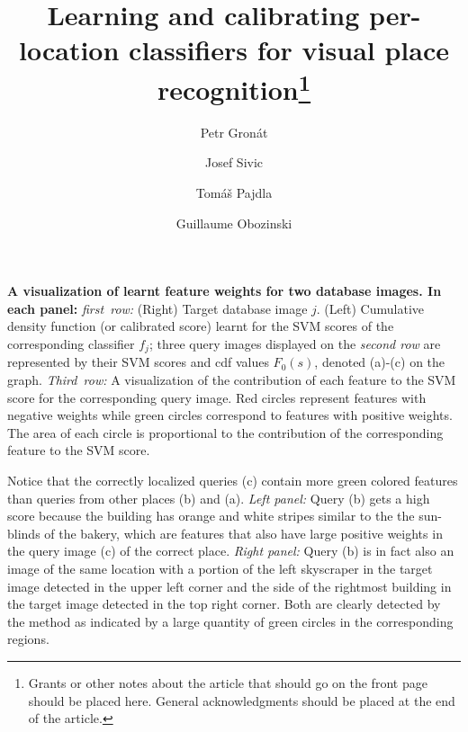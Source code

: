 {
   {\bf  A visualization of learnt feature weights for two database images. In each panel:} 
   \emph{first~row:} (Right) Target database image $j$. (Left) Cumulative density function (or calibrated score) learnt for the SVM scores of the corresponding classifier $f_j$;  three query images displayed on the \emph{second row} are represented by their SVM scores and cdf values $F_0(s)$, denoted (a)-(c) on the graph. \emph{Third~row:} A visualization of the contribution of each feature to the SVM score for the corresponding query image. Red circles represent features with negative weights while green circles correspond to features with positive weights. The area of each circle is proportional to the contribution of the corresponding feature to the SVM score.

   Notice that the correctly localized queries (c) contain more green colored features than queries from other places (b) and (a).
   {\it Left panel:}
   Query (b) gets a high score because the building has orange and white stripes similar to the the sun-blinds of the bakery, which are features that also have large positive weights in the query image (c) of the correct place.
   {\it Right panel:}
   Query (b) is in fact also an image of the same location with a portion of the left skyscraper in the target image detected in the upper left corner and the side of the rightmost building in the target image detected in the top right corner. Both are clearly detected by the method as indicated by a large quantity of green circles in the corresponding regions.
}
\newcommand{\diag}{\mathop{\mathrm{diag}}}

%
%


\title{Learning and calibrating per-location classifiers for visual place recognition\thanks{Grants or other notes
about the article that should go on the front page should be
placed here. General acknowledgments should be placed at the end of the article.}
}


\author{Petr Gron{\'a}t         \and
        Josef {S}ivic          \and
        Tom{\'a}{\v s} Pajdla   \and
        Guillaume Obozinski%
}



